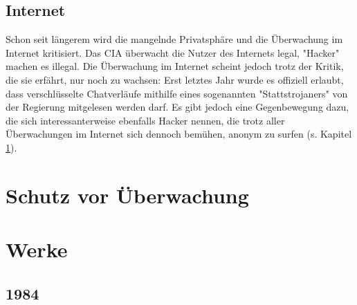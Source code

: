 \documentclass{article}
\begin{document}
\subsection{Internet\autocite{Internet}}
Schon seit längerem wird die mangelnde Privatsphäre und die Überwachung im Internet kritisiert. Das CIA überwacht die Nutzer des Internets legal, "Hacker" machen es illegal. Die Überwachung im Internet scheint jedoch trotz der Kritik, die sie erfährt, nur noch zu wachsen: Erst letztes Jahr wurde es offiziell erlaubt, dass verschlüsselte Chatverläufe mithilfe eines sogenannten "Stattstrojaners" von der Regierung mitgelesen werden darf. Es gibt jedoch eine Gegenbewegung dazu, die sich interessanterweise ebenfalls Hacker nennen, die trotz aller Überwachungen im Internet sich dennoch bemühen, anonym zu surfen (s. Kapitel \ref{sec:Schutz vor Ueberwachung}).

\section{Schutz vor Überwachung}
\label{sec:Schutz vor Ueberwachung}

\section{Werke}

\subsection{1984}
\label{subsec:1984}

\newpage
\printbibliography
\end{document}
